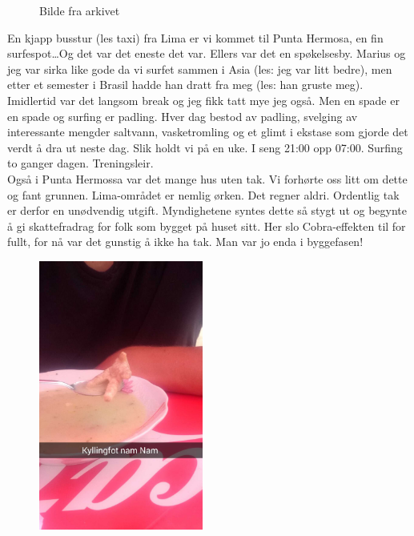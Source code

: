 \begin{figure}[H]
	\centering
	\noindent{}
	\caption*{Bilde fra arkivet}
\label{fig:takeropskrytt}
\end{figure}
En kjapp busstur (les taxi) fra Lima er vi kommet til Punta Hermosa,
en fin surfespot\ldots Og det var det eneste det var. Ellers var det en
spøkelsesby. Marius og jeg var sirka like gode da vi
surfet sammen i Asia (les: jeg var litt bedre), men etter et semester i Brasil hadde han dratt
fra meg (les: han gruste meg). Imidlertid var det langsom break og jeg fikk tatt
mye jeg også. Men en spade er en spade og surfing er padling. Hver dag
bestod av padling,
svelging av interessante mengder saltvann, vasketromling og et glimt
i ekstase som gjorde det verdt å dra ut neste dag. Slik holdt vi på en
uke. I seng 21:00 opp 07:00. Surfing to ganger dagen. Treningsleir.\\



Også i Punta Hermossa var det mange hus uten tak. Vi forhørte oss litt
om dette og fant grunnen. Lima-området er nemlig ørken. Det regner
aldri. Ordentlig tak er derfor en unødvendig utgift. Myndighetene
syntes dette så stygt ut og begynte å gi skattefradrag for folk som
bygget på huset sitt. Her slo Cobra-effekten til for fullt, for nå var
det gunstig å ikke
ha tak. Man var jo enda i byggefasen!


\begin{figure}[h]
	\begin{center}
	\includegraphics[width=0.48\textwidth]{kyllingfot}
	\caption*{}
\end{center}
\end{figure}



